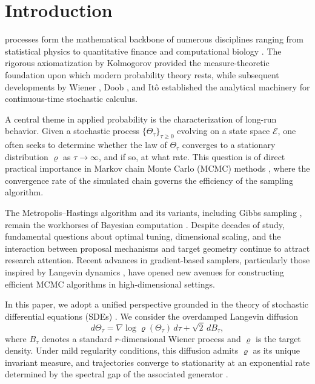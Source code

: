 \documentclass[journal]{IEEEtran}
\begin{document}
\section{Introduction}
 processes form the mathematical backbone of numerous disciplines ranging from statistical physics \cite{einstein1905, langevin1908} to quantitative finance \cite{black1973} and computational biology \cite{gillespie1977}. The rigorous axiomatization by Kolmogorov \cite{kolmogorov1933} provided the measure-theoretic foundation upon which modern probability theory rests, while subsequent developments by Wiener \cite{wiener1923}, Doob \cite{doob1942}, and It\^{o} \cite{ito1951} established the analytical machinery for continuous-time stochastic calculus.

A central theme in applied probability is the characterization of long-run behavior. Given a stochastic process $\{\Theta_\tau\}_{\tau \geq 0}$ evolving on a state space $\mathcal{E}$, one often seeks to determine whether the law of $\Theta_\tau$ converges to a stationary distribution $\varrho$ as $\tau \to \infty$, and if so, at what rate. This question is of direct practical importance in Markov chain Monte Carlo (MCMC) methods \cite{metropolis1953, hastings1970}, where the convergence rate of the simulated chain governs the efficiency of the sampling algorithm.

The Metropolis--Hastings algorithm \cite{metropolis1953, hastings1970} and its variants, including Gibbs sampling \cite{geman1984}, remain the workhorses of Bayesian computation \cite{robert2004}. Despite decades of study, fundamental questions about optimal tuning, dimensional scaling, and the interaction between proposal mechanisms and target geometry continue to attract research attention. Recent advances in gradient-based samplers, particularly those inspired by Langevin dynamics \cite{langevin1908}, have opened new avenues for constructing efficient MCMC algorithms in high-dimensional settings.

In this paper, we adopt a unified perspective grounded in the theory of stochastic differential equations (SDEs) \cite{oksendal2003, gardiner2009}. We consider the overdamped Langevin diffusion
\begin{equation}\label{eq:langevin}
  d\Theta_\tau = \nabla \log \varrho(\Theta_\tau)\, d\tau + \sqrt{2}\, dB_\tau,
\end{equation}
where $B_\tau$ denotes a standard $r$-dimensional Wiener process and $\varrho$ is the target density. Under mild regularity conditions, this diffusion admits $\varrho$ as its unique invariant measure, and trajectories converge to stationarity at an exponential rate determined by the spectral gap of the associated generator \cite{vanKampen2007}.
\end{document}
